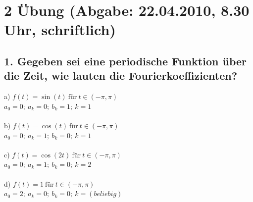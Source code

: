\section*{2 \"Ubung (Abgabe: 22.04.2010, 8.30 Uhr, schriftlich)}

\subsection*{1. Gegeben sei eine periodische Funktion \"uber die Zeit, wie lauten die Fourierkoeffizienten?}
a) $f(t) = \sin(t)~\text{f\"ur}~t \in (-\pi, \pi)$\\
$a_0 = 0; ~ a_k = 0; ~ b_k = 1; ~ k = 1$\\\\
b) $f(t) = \cos(t)~\text{f\"ur}~t \in (-\pi, \pi)$\\
$a_0 = 0; ~ a_k = 1; ~ b_k = 0; ~ k = 1$\\\\
c) $f(t) = \cos(2t)~\text{f\"ur}~t \in (-\pi, \pi)$\\
$a_0 = 0; ~ a_k = 1; ~ b_k = 0; ~ k = 2$\\\\
d) $f(t) = 1~\text{f\"ur}~t \in (-\pi, \pi)$\\
$a_0 = 2; ~ a_k = 0; ~ b_k = 0; ~ k = (beliebig)$

